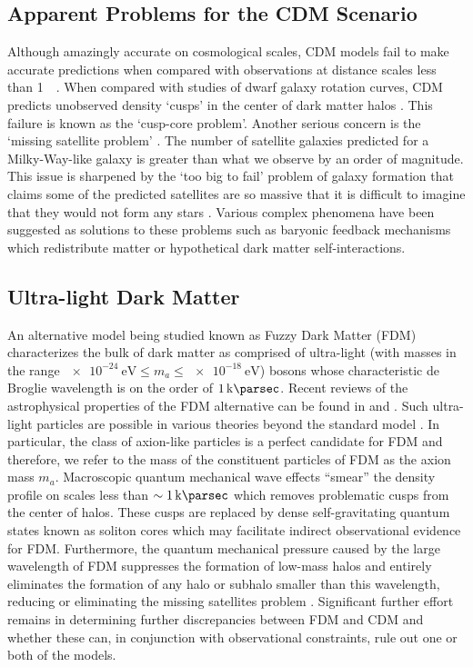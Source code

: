 \documentclass[usenatbib]{mnras}
\newcommand{\squote}[1]{\lq #1\rq}
\newcommand{\poweV}[1]{\SI{e#1}{\electronvolt}}
\begin{document}
\subsection{Apparent Problems for the CDM Scenario}


Although amazingly accurate on cosmological scales, CDM models fail to make accurate predictions when compared with observations at distance scales less {\color{red} than} \SI{1}{\kilo\parsec}. When compared with studies of dwarf galaxy rotation curves, CDM predicts unobserved density \squote{cusps} in the center of dark matter halos \citep{ultralight}. This failure is known as the \squote{cusp-core problem}. Another serious concern is the \squote{missing satellite problem}  \citep{missing_satellites}. The number of satellite galaxies predicted for a Milky-Way-like galaxy is greater than what we observe by an order of magnitude. This issue is sharpened by the \squote{too big to fail} problem of galaxy formation that claims some of the predicted satellites are so massive that it is difficult to imagine that they would not form any stars \citep{too_big_to_fail}. Various complex phenomena have been suggested as solutions to these problems such as baryonic feedback mechanisms which redistribute matter or  hypothetical dark matter self-interactions.

\subsection{Ultra-light Dark Matter}

An alternative model being studied known as Fuzzy Dark Matter (FDM) characterizes the bulk of dark matter as comprised of ultra-light (with masses in the range $\poweV{-24} \leq m_a \leq \poweV{-18}$) bosons whose characteristic de Broglie wavelength is on the order of $\SI{1}{\kilo\parsec}$. {\color{magenta} Recent reviews of the astrophysical properties of the FDM alternative can be found in \cite{ultralight} and \cite{axion_cosmology}. } Such ultra-light particles are possible in various theories beyond the standard model \citep{axion_cosmology}. In particular, the class of axion-like particles is a perfect candidate for FDM and therefore, we refer to the mass of the constituent particles of FDM as the axion mass $m_a$. Macroscopic quantum mechanical wave effects “smear” the density profile on scales less than $\sim \SI{1}{\kilo\parsec}$ which removes problematic cusps from the center of halos. These cusps are replaced by dense self-gravitating quantum states known as soliton cores which may facilitate indirect observational evidence for FDM. Furthermore, the quantum mechanical pressure caused by the large wavelength of FDM suppresses the formation of low-mass halos and entirely eliminates the formation of any halo or subhalo smaller than this wavelength, reducing or eliminating the missing satellites problem \citep{substructure_FDM}. Significant further effort remains in determining further discrepancies between FDM and CDM and whether these can, in conjunction with observational constraints, rule out one or both of the models.
 
\end{document}
